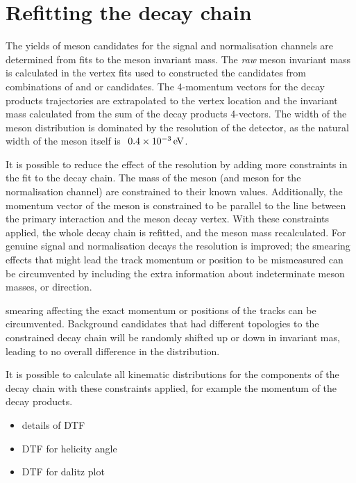 \section{Refitting the decay chain}
\label{sec:decaytreefitter}

The yields of \Bp meson candidates for the signal and normalisation channels are determined from fits to the \Bp meson invariant mass.
The \emph{raw} \Bp meson invariant mass is calculated in the vertex fits used to constructed the \Bp candidates from combinations of \Dsp and \phiz or \Dzb candidates. The 4-momentum vectors for the decay products trajectories are extrapolated to the vertex location and the invariant mass calculated from the sum of the decay products 4-vectors. The width of the \Bp meson distribution is dominated by the resolution of the \lhcb detector, as the natural width of the meson itself is $~0.4\times 10^{-3}\mathrm{\,e\kern -0.1em V}$.

It is possible to reduce the effect of the resolution by adding more constraints in the fit to the decay chain. The mass of the \Dsp meson (and \Dzb meson for the normalisation channel) are constrained to their known values. Additionally, the momentum vector of the \Bp meson is constrained to be parallel to the line between the primary interaction and the \Bp meson decay vertex. With these constraints applied, the whole decay chain is refitted, and the \Bp meson mass recalculated. For genuine signal and normalisation decays the resolution is improved; the smearing effects that might lead the track momentum or position to be mismeasured can be circumvented by including the extra information about indeterminate meson masses, or \Bp direction. 

smearing affecting the exact momentum or positions of the tracks can be circumvented. Background candidates that had different topologies to the constrained decay chain will be randomly shifted up or down in invariant mas, leading to no overall difference in the distribution.    



It is possible to calculate all kinematic distributions for the components of the decay chain with these constraints applied, for example the momentum of the decay products. 

{\color{Red}
\begin{itemize}
\item details of DTF
\item DTF for helicity angle
\item DTF for dalitz plot
\end{itemize}
}


